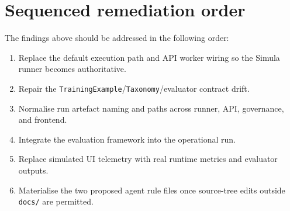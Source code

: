 \section{Sequenced remediation order}
\label{sec:remediation-order}
The findings above should be addressed in the following order:
\begin{enumerate}[label=\arabic*.]
  \item Replace the default execution path and API worker wiring so
    the Simula runner becomes authoritative.
  \item Repair the \texttt{TrainingExample}/\texttt{Taxonomy}/evaluator
    contract drift.
  \item Normalise run artefact naming and paths across runner, API,
    governance, and frontend.
  \item Integrate the evaluation framework into the operational run.
  \item Replace simulated UI telemetry with real runtime metrics and
    evaluator outputs.
  \item Materialise the two proposed agent rule files once source-tree
    edits outside \texttt{docs/} are permitted.
\end{enumerate}
